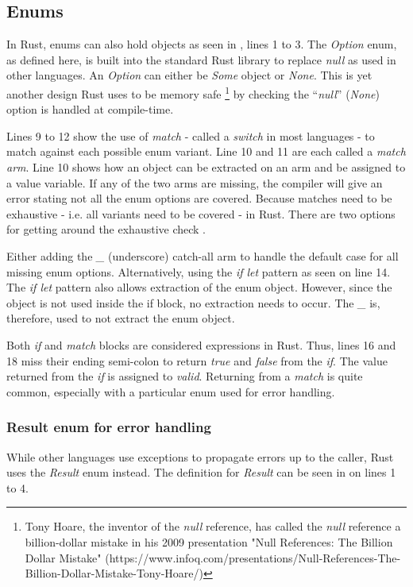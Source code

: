 \subsection{Enums}
In Rust, enums can also hold objects \cite{klabnik_2019_01} as seen in , lines 1 to 3.
The \textit{Option} enum, as defined here, is built into the standard Rust library \cite{klabnik_2019_01} to replace \textit{null} as used in other languages.
An \textit{Option} can either be \textit{Some} object or \textit{None}.
This is yet another design Rust uses to be memory safe \footnote{Tony Hoare, the inventor of the \textit{null} reference, has called the \textit{null} reference a billion-dollar mistake in his 2009 presentation "Null References: The Billion Dollar Mistake" (https://www.infoq.com/presentations/Null-References-The-Billion-Dollar-Mistake-Tony-Hoare/)} by checking the ``\textit{null}'' (\textit{None}) option is handled at compile-time.


Lines 9 to 12 show the use of \textit{match} - called a \textit{switch} in most languages - to match against each possible enum variant.
Line 10 and 11 are each called a \textit{match arm}.
Line 10 shows how an object can be extracted on an arm and be assigned to a value variable.
If any of the two arms are missing, the compiler will give an error stating not all the enum options are covered.
Because matches need to be exhaustive - i.e. all variants need to be covered - in Rust.
There are two options for getting around the exhaustive check \cite{klabnik_2019_01}.

Either adding the \textit{\_} (underscore) catch-all arm to handle the default case for all missing enum options.
Alternatively, using the \textit{if let} pattern as seen on line 14.
The \textit{if let} pattern also allows extraction of the enum object.
However, since the object is not used inside the if block, no extraction needs to occur.
The \textit{\_} is, therefore, used to not extract the enum object.

Both \textit{if} and \textit{match} blocks are considered expressions in Rust.
Thus, lines 16 and 18 miss their ending semi-colon to return \textit{true} and \textit{false} from the \textit{if}.
The value returned from the \textit{if} is assigned to \textit{valid}.
Returning from a \textit{match} is quite common, especially with a particular enum used for error handling.

\subsubsection{Result enum for error handling}
While other languages use exceptions to propagate errors up to the caller, Rust uses the \textit{Result} enum instead.
The definition for \textit{Result} can be seen in  on lines 1 to 4.


